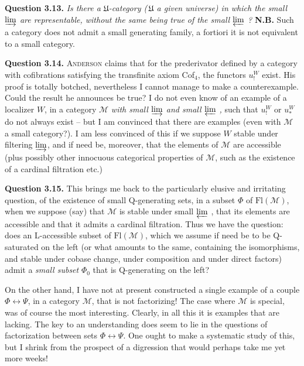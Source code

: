 \documentclass[11pt]{article}
\newcommand{\printedpage}[1]{\marginpar{\footnotesize p.~#1}}
\newcommand{\msp}[1]{\marginpar{\footnotesize [#1]}}
\newcommand{\limind}{\varinjlim}
\newcommand{\limproj}{\varprojlim}
\newcommand{\Fl}{\mathrm{Fl}}
\begin{document}
\marginpar{! \textbar}\textbf{Question 3.13.} \textit{Is there a $\mathfrak{U}$-category (\,$\mathfrak{U}$ a given universe) in which the small $\limind$ are representable, without the same being true of the small $\limproj$ ?} \textbf{N.B.} Such a category does not admit a small generating family, a fortiori it is not equivalent to a small category.

\msp{page 48}
\textbf{Question 3.14.} \textsc{Anderson} claims that for the prederivator defined by a category with cofibrations satisfying the transfinite axiom Cof$_4$, the functors $u_!^W$ exist. His proof is totally botched, nevertheless I cannot manage to make a counterexample. Could the result he announces be true? I do not even know of an example of a localizer $W$, in a category $\mathcal{M}$ \textit{with small $\limind$ and small $\limproj$ ,} such that $u_!^W$ or $u_*^W$ do not always exist -- but I am convinced that there are examples (even with $\mathcal{M}$ a small category?). I am less convinced of this if we suppose $W$ stable under filtering $\limind$, and if need be, moreover, that the elements of $\mathcal{M}$ are accessible (plus possibly other innocuous categorical properties of $\mathcal{M}$, such as the existence of a cardinal
\printedpage{26}
\msp{page 49}
filtration etc.)

\textbf{Question 3.15.} This brings me back to the particularly elusive and irritating question, of the existence of small Q-generating sets, in a subset $\Phi$ of $\Fl(\mathcal{M})$, when we suppose (say) that $\mathcal{M}$ is stable under small $\limproj$ , that its elements are accessible and that it admits a cardinal filtration. Thus we have the question: does an L-accessible subset of $\Fl(\mathcal{M})$, which we assume if need be to be Q-saturated on the left (or what amounts to the same, containing the isomorphisms, and stable under cobase change, under composition and under direct factors) admit a \textit{small subset} $\Phi_0$ that is Q-generating on the left? %

\marginpar{! \textbar}On the other hand, I have not at present constructed a single example of a couple $\Phi \longleftrightarrow \Psi$, in a category $\mathcal{M}$, that is not factorizing! The case where $\mathcal{M}$ is special, was of course the most interesting. Clearly, in all
\msp{page 50}
this it is examples that are lacking. The key to an understanding does seem to lie in the questions of factorization between sets $\Phi \longleftrightarrow \Psi$. One ought to make a systematic study of this, but I shrink from the prospect of a digression that would perhaps take me yet more weeks! %
\end{document}
